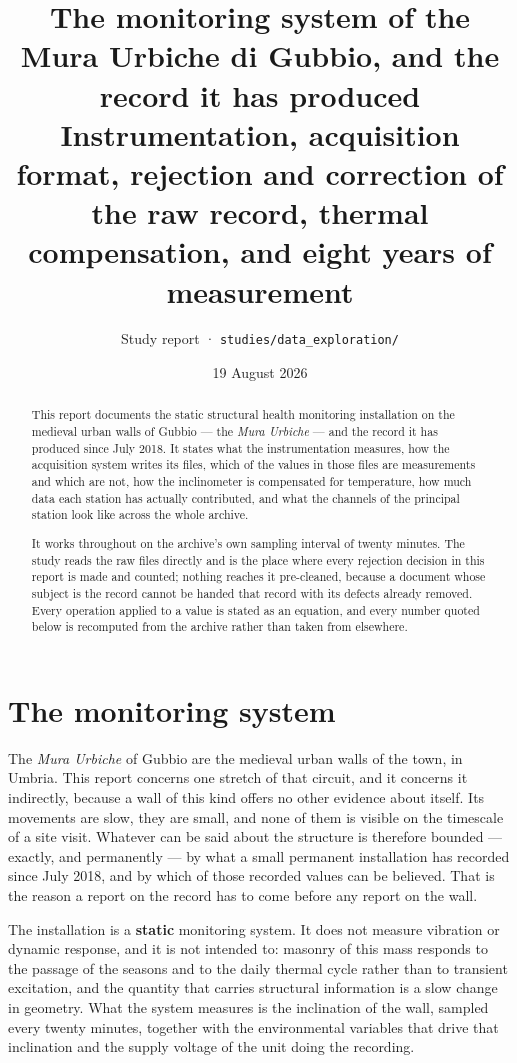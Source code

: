 \documentclass[11pt,a4paper]{article}
\title{\vspace{-1.2cm}\textbf{The monitoring system of the Mura Urbiche di
Gubbio, and the record it has produced}\\[2mm] \large Instrumentation, acquisition format, rejection and correction of the raw record, thermal compensation, and eight years of measurement}
\author{Study report · \texttt{studies/data\_exploration/}}
\date{19 August 2026}
\begin{document}
\maketitle
\thispagestyle{fancy}

\begin{abstract}
\noindent
This report documents the static structural health monitoring installation on the medieval urban walls of Gubbio --- the \emph{Mura Urbiche} --- and the record it has produced since July 2018. It states what the instrumentation measures, how the acquisition system writes its files, which of the values in those files are measurements and which are not, how the inclinometer is compensated for temperature, how much data each station has actually contributed, and what the channels of the principal station look like across the whole archive.

It works throughout on the archive's own sampling interval of twenty minutes. The study reads the raw files directly and is the place where every rejection decision in this report is made and counted; nothing reaches it pre-cleaned, because a document whose subject is the record cannot be handed that record with its defects already removed. Every operation applied to a value is stated as an equation, and every number quoted below is recomputed from the archive rather than taken from elsewhere.
\end{abstract}

\tableofcontents

\section{The monitoring system}
\label{sec:system}

The \emph{Mura Urbiche} of Gubbio are the medieval urban walls of the town, in Umbria. This report concerns one stretch of that circuit, and it concerns it indirectly, because a wall of this kind offers no other evidence about itself. Its movements are slow, they are small, and none of them is visible on the timescale of a site visit. Whatever can be said about the structure is therefore bounded --- exactly, and permanently --- by what a small permanent installation has recorded since July 2018, and by which of those recorded values can be believed. That is the reason a report on the record has to come before any report on the wall.

The installation is a \textbf{static} monitoring system. It does not measure vibration or dynamic response, and it is not intended to: masonry of this mass responds to the passage of the seasons and to the daily thermal cycle rather than to transient excitation, and the quantity that carries structural information is a slow change in geometry. What the system measures is the inclination of the wall, sampled every twenty minutes, together with the environmental variables that drive that inclination and the supply voltage of the unit doing the recording.
\end{document}
